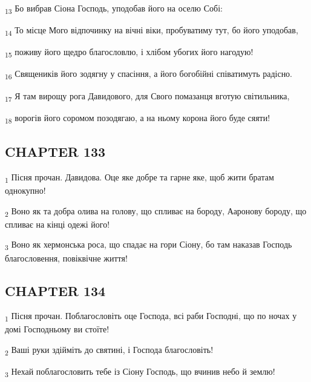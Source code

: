 \begin{tcolorbox}
\textsubscript{13} Бо вибрав Сіона Господь, уподобав його на оселю Собі:
\end{tcolorbox}
\begin{tcolorbox}
\textsubscript{14} То місце Мого відпочинку на вічні віки, пробуватиму тут, бо його уподобав,
\end{tcolorbox}
\begin{tcolorbox}
\textsubscript{15} поживу його щедро благословлю, і хлібом убогих його нагодую!
\end{tcolorbox}
\begin{tcolorbox}
\textsubscript{16} Священиків його зодягну у спасіння, а його богобійні співатимуть радісно.
\end{tcolorbox}
\begin{tcolorbox}
\textsubscript{17} Я там вирощу рога Давидового, для Свого помазанця вготую світильника,
\end{tcolorbox}
\begin{tcolorbox}
\textsubscript{18} ворогів його соромом позодягаю, а на ньому корона його буде сяяти!
\end{tcolorbox}
\subsection{CHAPTER 133}
\begin{tcolorbox}
\textsubscript{1} Пісня прочан. Давидова. Оце яке добре та гарне яке, щоб жити братам однокупно!
\end{tcolorbox}
\begin{tcolorbox}
\textsubscript{2} Воно як та добра олива на голову, що спливає на бороду, Ааронову бороду, що спливає на кінці одежі його!
\end{tcolorbox}
\begin{tcolorbox}
\textsubscript{3} Воно як хермонська роса, що спадає на гори Сіону, бо там наказав Господь благословення, повіквічне життя!
\end{tcolorbox}
\subsection{CHAPTER 134}
\begin{tcolorbox}
\textsubscript{1} Пісня прочан. Поблагословіть оце Господа, всі раби Господні, що по ночах у домі Господньому ви стоїте!
\end{tcolorbox}
\begin{tcolorbox}
\textsubscript{2} Ваші руки здійміть до святині, і Господа благословіть!
\end{tcolorbox}
\begin{tcolorbox}
\textsubscript{3} Нехай поблагословить тебе із Сіону Господь, що вчинив небо й землю!
\end{tcolorbox}
